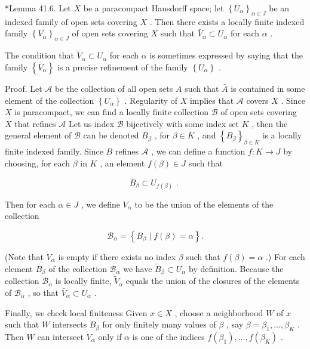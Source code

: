 \documentclass[10pt]{article}
\begin{document}
*Lemma 41.6. Let \(X\) be a paracompact Hausdorff space; let \({\left\{  {U}_{\alpha }\right\}  }_{\alpha  \in  J}\) be an indexed family of open sets covering \(X\) . Then there exists a locally finite indexed family \({\left\{  {V}_{\alpha }\right\}  }_{\alpha  \in  J}\) of open sets covering \(X\) such that \({\bar{V}}_{\alpha } \subset  {U}_{\alpha }\) for each \(\alpha\) .

The condition that \({\widetilde{V}}_{\alpha } \subset  {U}_{\alpha }\) for each \(\alpha\) is sometimes expressed by saying that the family \(\left\{  {\bar{V}}_{\alpha }\right\}\) is a precise refinement of the family \(\left\{  {U}_{\alpha }\right\}\) .

Proof. Let \(\mathcal{A}\) be the collection of all open sets \(A\) such that \(\bar{A}\) is contained in some element of the collection \(\left\{  {U}_{\alpha }\right\}\) . Regularity of \(X\) implies that \(\mathcal{A}\) covers \(X\) . Since \(X\) is paracompact, we can find a locally finite collection \(\mathcal{B}\) of open sets covering \(X\) that refines \(\mathcal{A}\) Let us index \(\mathcal{B}\) bijectively with some index set \(K\) , then the general element of \(\mathcal{B}\) can be denoted \({B}_{\beta }\) , for \(\beta  \in  K\) , and \({\left\{  {B}_{\beta }\right\}  }_{\beta  \in  K}\) is a locally finite indexed family. Since \(B\) refines \(\mathcal{A}\) , we can define a function \(f : K \rightarrow  J\) by choosing, for each \(\beta\) in \(K\) , an element \(f\left( \beta \right)  \in  J\) such that

\[
{\bar{B}}_{\beta } \subset  {U}_{f\left( \beta \right) }\text{ . }
\]

Then for each \(\alpha  \in  J\) , we define \({V}_{\alpha }\) to be the union of the elements of the collection

\[
{\mathcal{B}}_{\alpha } = \left\{  {{B}_{\beta } \mid  f\left( \beta \right)  = \alpha }\right\}  .
\]

(Note that \({V}_{\alpha }\) is empty if there exists no index \(\beta\) such that \(f\left( \beta \right)  = \alpha\) .) For each element \({B}_{\beta }\) of the collection \({\mathcal{B}}_{\alpha }\) we have \({\widetilde{B}}_{\beta } \subset  {U}_{\alpha }\) by definition. Because the collection \({\mathcal{B}}_{\alpha }\) is locally finite, \({\widetilde{V}}_{\alpha }\) equals the union of the closures of the elements of \({\mathcal{B}}_{\alpha }\) , so that \({\bar{V}}_{\alpha } \subset  {U}_{\alpha }\) .

Finally, we check local finiteness Given \(x \in  X\) , choose a neighborhood \(W\) of \(x\) such that \(W\) intersects \({B}_{\beta }\) for only finitely many values of \(\beta\) , say \(\beta  = {\beta }_{1},\ldots ,{\beta }_{K}\) . Then \(W\) can intersect \({V}_{\alpha }\) only if \(\alpha\) is one of the indices \(f\left( {\beta }_{1}\right) ,\ldots ,f\left( {\beta }_{K}\right)\) .
\end{document}
